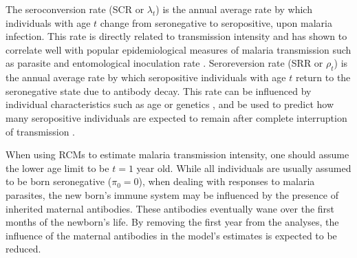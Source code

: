 The seroconversion rate (SCR or $\lambda_t$) is the annual average rate by which individuals with age $t$ change from seronegative to seropositive, upon malaria infection.
This rate is directly related to transmission intensity and has shown to correlate well with popular epidemiological measures of malaria transmission such as parasite and entomological inoculation rate \cite{corran2007serology, drakeley2005estimating, bodker2003relationship}.
Seroreversion rate (SRR or $\rho_t$) is the annual average rate by which seropositive individuals with age $t$ return to the seronegative state due to antibody decay.
This rate can be influenced by individual characteristics such as age or genetics \cite{corran2007serology}, and be used to predict how many seropositive individuals are expected to remain after complete interruption of transmission \cite{corran2007serology}.
%
%

When using RCMs to estimate malaria transmission intensity, one should assume the lower age limit to be $t=1$ year old.
While all individuals are usually assumed to be born seronegative ($\pi_0=0$), when dealing with responses to malaria parasites, the new born's immune system may be influenced by the presence of inherited maternal antibodies.
These antibodies eventually wane over the first months of the newborn's life.
By removing the first year from the analyses, the influence of the maternal antibodies in the model's estimates is expected to be reduced.


